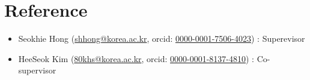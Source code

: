 \documentclass[a4paper,20pt]{article}
\begin{document}
\section{\textbf{Reference}}
\begin{itemize}
    \item {Seokhie Hong
           (\href{mailto:shhong@korea.ac.kr}{shhong@korea.ac.kr},
           orcid: \href{https://orcid.org/0000-0001-7506-4023}{0000-0001-7506-4023})
           : Superevisor}
    \vspace{-4pt}
    \item {HeeSeok Kim
           (\href{mailto:80khs@korea.ac.kr}{80khs@korea.ac.kr},
           orcid: \href{https://orcid.org/0000-0001-8137-4810}{0000-0001-8137-4810})
           : Co-supervisor}
\end{itemize}











\iffalse

\newcommand{\resumeItem}[2]{
  \item\small{
    \textbf{#1}{: #2 \vspace{-2pt}}
  }
}

\newcommand{\resumeItemWithoutTitle}[1]{
  \item\small{
    {\vspace{-2pt}}
  }
}

\newcommand{\resumeSubheading}[4]{
  \vspace{-1pt}\item
    \begin{tabular*}{0.97\textwidth}{l@{\extracolsep{\fill}}r}
      \textbf{#1} & #2 \\
      \textit{#3} & \textit{#4} \\
    \end{tabular*}\vspace{-5pt}
}

\newcommand{\resumeSubItem}[2]{\resumeItem{#1}{#2}\vspace{-3pt}}
\renewcommand{\labelitemii}{$\circ$}

\newcommand{\resumeSubHeadingListStart}{\begin{itemize}[leftmargin=*]}
\newcommand{\resumeSubHeadingListEnd}{\end{itemize}}
\newcommand{\resumeItemListStart}{\begin{itemize}}
\newcommand{\resumeItemListEnd}{\end{itemize}\vspace{-5pt}}
\end{document}

